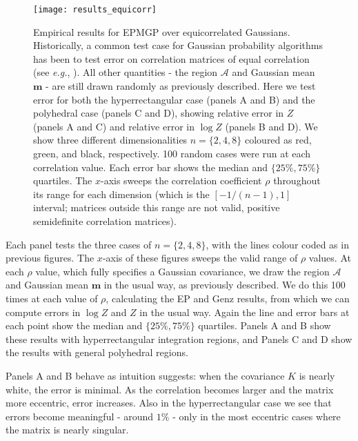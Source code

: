 \documentclass[twoside,11pt]{article}
\def\m{{\mathbf m}}
\def\regionA{\mathcal{A}}
\begin{document}
%
\begin{figure}
\centering
\hspace{0.0cm}
\texttt{[image: results\_equicorr]}
\caption{\small{ Empirical results for EPMGP over equicorrelated Gaussians.  Historically, a common test case for Gaussian probability algorithms has been to test error on correlation matrices of equal correlation (see {\it e.g.}, \cite{gassmann2002, shervish1984}).  All other quantities - the region $\regionA$ and Gaussian mean $\m$ - are still drawn randomly as previously described.  Here we test error for both the hyperrectangular case (panels A and B) and the polyhedral case (panels C and D), showing relative error in $Z$ (panels A and C) and relative error in $\log Z$ (panels B and D).  We show three different dimensionalities $n = \{2,4,8\}$ coloured as red, green, and black, respectively.  100 random cases were run at each correlation value.  Each error bar shows the median and $\{25\%,75\%\}$ quartiles.  The $x$-axis sweeps the correlation coefficient $\rho$ throughout its range for each dimension (which is the $[-1/(n-1) , 1]$ interval; matrices outside this range are not valid, positive semidefinite correlation matrices). }}
\label{fig:resultsequicorr} %
\end{figure}
%

Each panel tests the three cases of $n = \{2,4,8\}$, with the lines colour coded as in previous figures.  The $x$-axis of these figures sweeps the valid range of $\rho$ values.  At each $\rho$ value, which fully specifies a Gaussian covariance, we draw the region $\regionA$ and Gaussian mean $\m$ in the usual way, as previously described.  We do this 100 times at each value of $\rho$, calculating the EP and Genz results, from which we can compute errors in $\log Z$ and $Z$ in the usual way.  Again the line and error bars at each point show the median and $\{25\%,75\%\}$ quartiles.   Panels A and B show these results with hyperrectangular integration regions, and Panels C and D show the results with general polyhedral regions.

Panels A and B behave as intuition suggests: when the covariance $K$ is nearly white, the error is minimal.  As the correlation becomes larger and the matrix more eccentric, error increases.  Also in the hyperrectangular case we see that errors become meaningful - around $1\%$ - only in the most eccentric cases where the matrix is nearly singular. 
\end{document}

